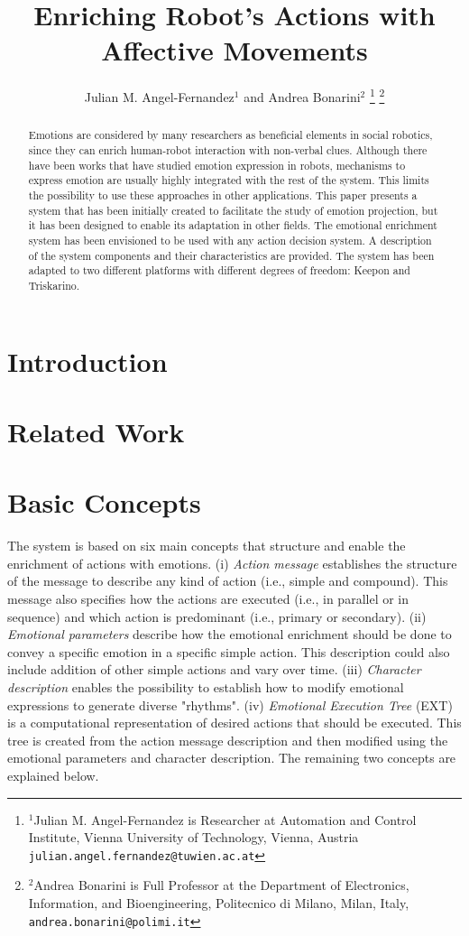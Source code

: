 \documentclass[letterpaper, 10 pt, conference]{ieeeconf}  %
\title{\LARGE \bf
Enriching Robot's Actions with Affective Movements
}
\author{Julian M. Angel-Fernandez$^{1}$ and Andrea Bonarini$^{2}$%
\thanks{$^{1}$Julian M. Angel-Fernandez is Researcher at Automation and Control Institute, Vienna University of Technology, Vienna, Austria
        {\tt\small julian.angel.fernandez@tuwien.ac.at}}%
\thanks{$^{2}$Andrea Bonarini is Full Professor at the Department of Electronics, Information, and Bioengineering, Politecnico di Milano, Milan, Italy,
        {\tt\small andrea.bonarini@polimi.it}}%
}
\begin{document}
\maketitle
\thispagestyle{empty}
\pagestyle{empty}


\begin{abstract}
Emotions are considered by many researchers as beneficial elements in social robotics, since they can enrich human-robot interaction with non-verbal clues. Although there have been works that have studied emotion expression in robots, mechanisms to express emotion are usually highly integrated with the rest of the system. This limits the possibility to use these approaches in other applications. This paper presents a system that has been initially created to facilitate the study of emotion projection, but it has been designed to enable its adaptation in other fields. The emotional enrichment system has been envisioned to be used with any action decision system. A description of the system components and their characteristics are provided. The system has been adapted to two different platforms with different degrees of freedom: Keepon and Triskarino. 
\end{abstract}

\section{Introduction}

\section{Related Work}
\label{sec:related_work}

\section{Basic Concepts}
\label{sec:concepts}
The system is based on six main concepts that structure and enable the enrichment of actions with emotions. (i) \textit{Action message} establishes the structure of the message to describe any kind of action (i.e., simple and compound). This message also specifies how the actions are executed (i.e., in parallel or in sequence) and which action is predominant (i.e., primary or secondary). (ii) \textit{Emotional parameters} describe how the emotional enrichment should be done to convey a specific emotion in a specific simple action. This description could also include addition of other simple actions and vary over time. (iii) \textit{Character description} enables the possibility to establish how to modify emotional expressions to generate diverse "rhythms". (iv) \textit{Emotional Execution Tree} (EXT) is a computational representation of desired actions that should be executed. This tree is created from the action message description and then modified using the emotional parameters and character description. The remaining two concepts are explained below.
\end{document}
